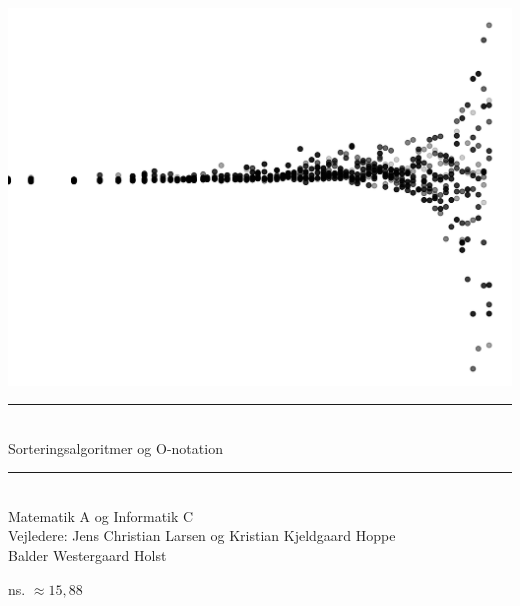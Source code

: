 






\selectfont

\setcounter{page}{1}


\begin{titlepage}
	\begin{center}
		\includegraphics[width=.35\textwidth,trim=0 0 0 -5cm]{../img/forsidePlot.png}

		\vspace{2.9cm}

		\rule{.6\textwidth}{0.4pt} \\
		\vspace{5mm}
		\huge Sorteringsalgoritmer og O-notation \\
		\vspace{1mm}
		\rule{.6\textwidth}{0.4pt} \\
		\vspace{4mm}
		\Large
		Matematik A og Informatik C \\
		\vspace{5cm}
		\large
		Vejledere: Jens Christian Larsen og Kristian Kjeldgaard Hoppe\\
		\vspace{1cm}
		Balder Westergaard Holst
	\end{center}
	\vspace{2cm}
	\raggedleft
	ns. $\approx 15,88$ 
\end{titlepage}




\tableofcontents
\pagestyle{plain}
\listoffigures

\newpage
\setcounter{page}{1}
\pagestyle{fancy}


\thispagestyle{fancy}









\printbibliography[title=Litteraturliste]



\thispagestyle{fancy}





